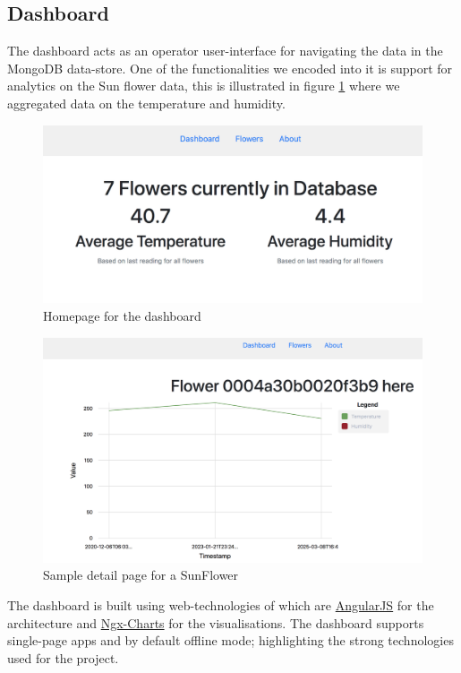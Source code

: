 \subsection{Dashboard}
The dashboard acts as an operator user-interface for navigating the data in the MongoDB data-store. One of the functionalities we encoded into it is support for analytics on the Sun flower data, this is illustrated in figure \ref{figure:home} where we aggregated data on the temperature and humidity.
\begin{figure}
	\centering
	\includegraphics[width=\linewidth]{home}
	\caption{Homepage for the dashboard}
	\label{figure:home}
\end{figure}
\begin{figure}
	\centering
	\includegraphics[width=\linewidth]{flowers}
	\caption{Sample detail page for a SunFlower}
	\label{figure:flower}
\end{figure}

The dashboard is built using web-technologies of which are \href{www.angular.io}{AngularJS} for the architecture and \href{https://swimlane.github.io/ngx-charts/}{Ngx-Charts} for the visualisations. The dashboard supports single-page apps and by default offline mode; highlighting the strong technologies used for the project.

